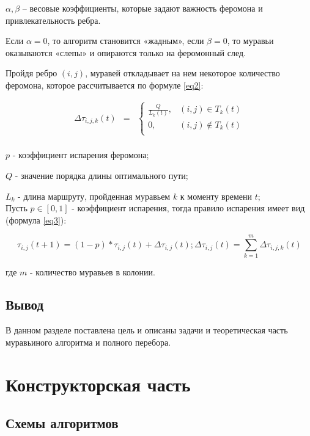 \documentclass[12pt]{report}
\begin{document}
$\alpha, \beta$ – весовые коэффициенты, которые задают важность феромона и привлекательность ребра.

Если $\alpha = 0$, то алгоритм становится «жадным», если $\beta = 0$, то муравьи оказываются «слепы» и опираются только на феромонный след.


Пройдя ребро $(i, j)$, муравей откладывает на нем некоторое количество феромона, которое рассчитывается по формуле \ref{eq2}:

\begin{equation}
	\label{eq2} 
	\begin{matrix}
		\Delta\tau_{i,j,k}(t) & = 
		& \left \{
		\begin{matrix}
			\frac{Q}{L_k(t)}, & (i,j) \in T_k(t) \\
			0, & (i,j) \notin T_k(t) \\
		\end{matrix} \right.
	\end{matrix}
\end{equation}\\

$p$ - коэффициент испарения феромона; 

$Q$ - значение порядка длины оптимального пути; 

$L_k$ - длина маршруту, пройденная муравьем $k$ к моменту времени $t$;\\

Пусть $p \in [0, 1]$ - коэффициент испарения, тогда правило испарения имеет вид (формула \ref{eq3}):  

\begin{equation}
	\label{eq3} 
	\tau_{i,j}(t+1) = (1-p)*\tau_{i,j}(t) + \Delta\tau_{i,j}(t); \Delta\tau_{i,j}(t) = \sum\limits_{k = 1}^{m} \Delta\tau_{i,j,k}(t)
\end{equation} 

где $m$ - количество муравьев в колонии.

\section{Вывод}
	В данном разделе поставлена цель и описаны задачи и теоретическая часть муравьиного алгоритма и полного перебора.
	
	
\clearpage

\chapter{Конструкторская часть}

\section{Схемы алгоритмов}
\end{document}
